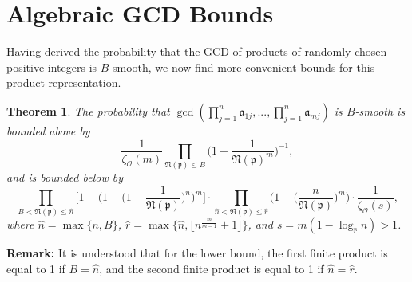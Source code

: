 \documentclass[10pt,a4paper]{article}
\newtheorem{theorem}{Theorem}
\newcommand{\f}[1]{\mathfrak{#1}}
\begin{document}
	\section{Algebraic GCD Bounds}
	Having derived the probability that the GCD of products of randomly chosen positive integers is $B$-smooth, we now find more convenient bounds for this product representation.
	
	\begin{theorem} The probability that $\gcd(\prod_{j=1}^n \f{a}_{1j}, ..., \prod_{j=1}^{n}\f{a}_{mj})$ is $B$-smooth is bounded above by 
		$$\frac{1}{\zeta_\mathcal{O}(m)}\prod_{\f{N}(\f{p})\leq B}\Big(1-\frac{1}{\f{N}(\f{p})^m}\Big)^{-1},$$
		and is bounded below by 
		$$\prod_{B<\f{N}(\f{p})\leq\hat{n}} \Big[1 - \Big(1 - \Big(1 - \frac{1}{\f{N}(\f{p})}\Big)^n \Big)^m\Big] \cdot \prod_{\hat{n}<\f{N}(\f{p})\leq\hat{r}} \Big(1 - \Big(\frac{n}{\f{N}(\f{p})}\Big)^m\Big) \cdot \frac{1}{\zeta_\mathcal{O}(s)},$$
		where $\hat{n}=\max\{n,B\}$, $\hat{r}=\max\{\hat{n}, \lfloor n^{\frac{m}{m-1}}+1\rfloor\}$, and $s = m(1 - \log_{\hat{r}}{n}) > 1$.
	\end{theorem} 
	
	\noindent \textbf{Remark:} It is understood that for the lower bound, the first finite product is equal to 1 if $B = \hat{n}$, and the second finite product is equal to 1 if $\hat{n}=\hat{r}$.
	
\end{document}
